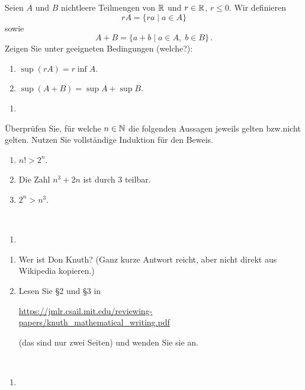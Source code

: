 \begin{aufg}[6 Punkte]
Seien $A$ und $B$ nichtleere Teilmengen von $\mathbb{R}$ und $r\in\mathbb{R}$, $r\leq 0$. Wir definieren 
\[
rA = \lbrace ra \mid a\in A\rbrace
\]
sowie
\[
A+B = \lbrace a+b \mid a\in A, \; b\in B \rbrace\,.
\]
Zeigen Sie unter geeigneten Bedingungen (welche?):
\begin{enumerate}[label=$\mathrm{(\roman*)}$, ref=$\mathrm{\roman*}$]
\item $\sup(rA) = r\inf A$.
\item $\sup(A+B) = \sup A + \sup B$.
\end{enumerate}
\end{aufg}


\bigskip

\begin{lsg}
\begin{enumerate}[label=$\mathrm{(\roman*)}$, ref=$\mathrm{\roman*}$]
\item 
\end{enumerate}
\end{lsg}


\bigskip


\begin{aufg}[6 Punkte] \"Uberpr\"ufen Sie, f\"ur welche $n\in\mathbb{N}$ die folgenden Aussagen jeweils gelten bzw.\@ nicht gelten. Nutzen Sie vollst\"andige Induktion f\"ur den Beweis.
\begin{enumerate}[label=$\mathrm{(\roman*)}$, ref=$\mathrm{\roman*}$]
\item $n!>2^n$.
\item Die Zahl $n^3+2n$ ist durch $3$ teilbar.
\item $2^n > n^3$.
\end{enumerate}
\end{aufg}
 
\bigskip

\begin{lsg}\mbox{ }
\begin{enumerate}[label=$\mathrm{(\roman*)}$, ref=$\mathrm{\roman*}$]
\item 
\end{enumerate}
\end{lsg}


\bigskip

\begin{aufg} \mbox{}
\begin{enumerate}[label=$\mathrm{(\roman*)}$, ref=$\mathrm{\roman*}$]
\item Wer ist Don Knuth? (Ganz kurze Antwort reicht, aber nicht direkt aus Wikipedia kopieren.)
\item Lesen Sie §2 und §3 in
\begin{center}
 \url{https://jmlr.csail.mit.edu/reviewing-papers/knuth_mathematical_writing.pdf}
\end{center}
(das sind nur zwei Seiten) und wenden Sie sie an.
\end{enumerate}
\end{aufg}

\bigskip

\begin{lsg}\mbox{ }
\begin{enumerate}[label=$\mathrm{(\roman*)}$, ref=$\mathrm{\roman*}$]
\item 
\end{enumerate}
\end{lsg}

